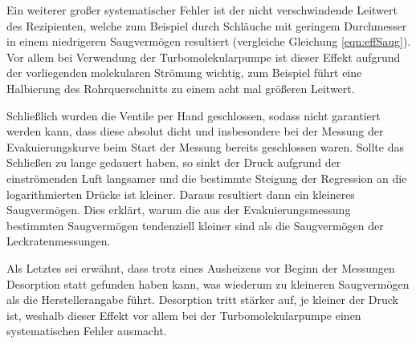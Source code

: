 Ein weiterer großer systematischer Fehler ist der nicht verschwindende Leitwert
des Rezipienten, welche zum Beispiel durch Schläuche mit geringem Durchmesser
in einem niedrigeren Saugvermögen resultiert (vergleiche Gleichung \eqref{eqn:effSaug}).
Vor allem bei Verwendung der Turbomolekularpumpe ist dieser Effekt
aufgrund der vorliegenden molekularen Strömung wichtig,
zum Beispiel führt eine Halbierung des Rohrquerschnitts zu einem acht mal größeren Leitwert.

Schließlich wurden die Ventile per Hand geschlossen, sodass nicht garantiert
werden kann, dass diese absolut dicht und insbesondere bei der
Messung der Evakuierungskurve beim Start der Messung bereits geschlossen waren.
Sollte das Schließen zu lange gedauert haben, so sinkt der Druck aufgrund der
einströmenden Luft langsamer und die bestimmte Steigung der Regression an die
logarithmierten Drücke ist kleiner.
Daraus resultiert dann ein kleineres Saugvermögen. Dies erklärt, warum die
aus der Evakuierungsmessung bestimmten Saugvermögen tendenziell kleiner sind
als die Saugvermögen der Leckratenmessungen.

Als Letztes sei erwähnt, dass trotz eines Ausheizens vor Beginn der Messungen
Desorption statt gefunden haben kann, was wiederum zu kleineren Saugvermögen
als die Herstellerangabe führt. Desorption tritt stärker auf, je kleiner der
Druck ist, weshalb dieser Effekt vor allem bei der Turbomolekularpumpe einen
systematischen Fehler ausmacht.

